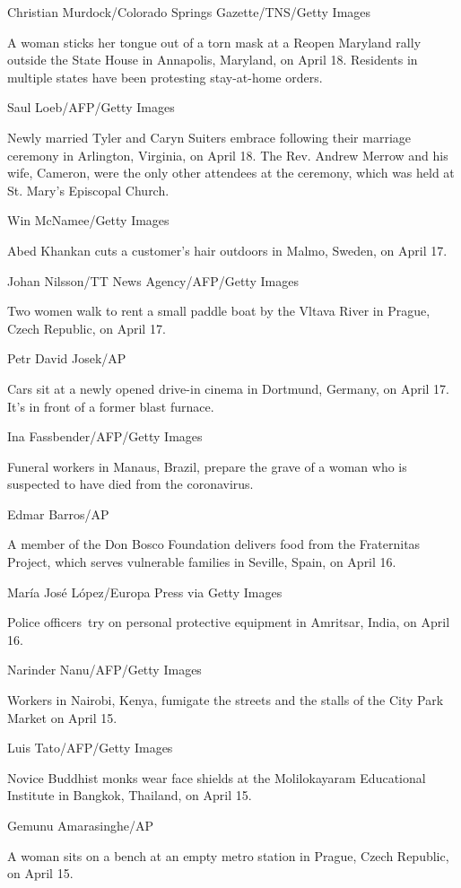 Christian Murdock/Colorado Springs Gazette/TNS/Getty Images

A woman sticks her tongue out of a torn mask at a Reopen Maryland rally
outside the State House in Annapolis, Maryland, on April 18. Residents
in multiple states have been protesting stay-at-home orders.

Saul Loeb/AFP/Getty Images

Newly married Tyler and Caryn Suiters embrace following their marriage
ceremony in Arlington, Virginia, on April 18. The Rev. Andrew Merrow and
his wife, Cameron, were the only other attendees at the ceremony, which
was held at St. Mary's Episcopal Church.

Win McNamee/Getty Images

Abed Khankan cuts a customer's hair outdoors in Malmo, Sweden, on April
17.

Johan Nilsson/TT News Agency/AFP/Getty Images

Two women walk to rent a small paddle boat by the Vltava River in
Prague, Czech Republic, on April 17.

Petr David Josek/AP

Cars sit at a newly opened drive-in cinema in Dortmund, Germany, on
April 17. It's in front of a former blast furnace.

Ina Fassbender/AFP/Getty Images

Funeral workers in Manaus, Brazil, prepare the grave of a woman who is
suspected to have died from the coronavirus.

Edmar Barros/AP

A member of the Don Bosco Foundation delivers food from the Fraternitas
Project, which serves vulnerable families in Seville, Spain, on April
16.

María José López/Europa Press via Getty Images

Police officers~try on personal protective equipment in Amritsar, India,
on April 16.

Narinder Nanu/AFP/Getty Images

Workers in Nairobi, Kenya, fumigate the streets and the stalls of the
City Park Market on April 15.

Luis Tato/AFP/Getty Images

Novice Buddhist monks wear face shields at the Molilokayaram Educational
Institute in Bangkok, Thailand, on April 15.

Gemunu Amarasinghe/AP

A woman sits on a bench at an empty metro station in Prague, Czech
Republic, on April 15.

